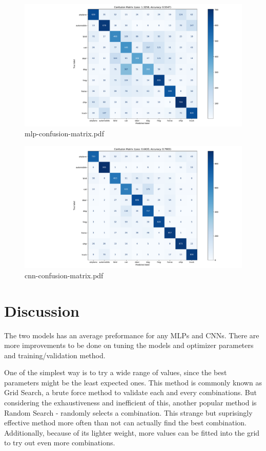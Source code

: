 \documentclass{report}
\begin{document}
\begin{figure}[ht]
    \center
    \includegraphics[scale=0.385]{../output/mlp-confusion-matrix.pdf}
    \caption{mlp-confusion-matrix.pdf}
\end{figure}

\begin{figure}[ht]
    \center
    \includegraphics[scale=0.385]{../output/cnn-confusion-matrix.pdf}
    \caption{cnn-confusion-matrix.pdf}
\end{figure}

\section{Discussion}
The two models has an average preformance for any MLPs and CNNs. There are more improvements to be done 
on tuning the models and optimizer parameters and training/validation method. 

One of the simplest way is to try a wide range of values, since the best parameters might be the least 
expected ones. This method is commonly known as Grid Search, a brute force method to validate each and 
every combinations. But considering the exhaustiveness and inefficient of this, another popular method is 
Random Search - randomly selects a combination. This strange but suprisingly effective method more often 
than not can actually find the best combination. Additionally, because of its lighter weight, more values
can be fitted into the grid to try out even more combinations.
\end{document}
